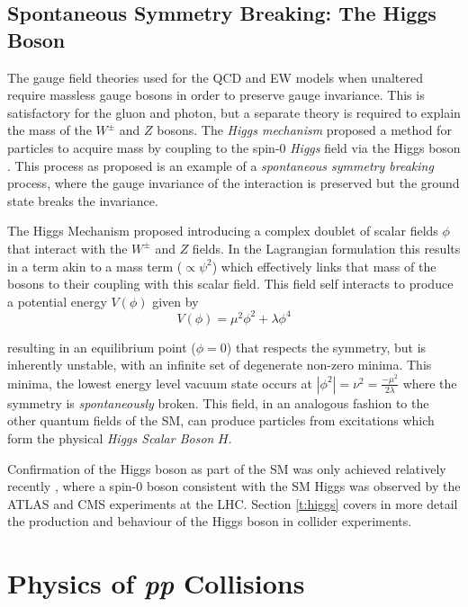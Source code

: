 	\subsection{Spontaneous Symmetry Breaking: The Higgs Boson}
	\label{t:symbreak}

	The gauge field theories used for the QCD and EW models when unaltered require massless gauge bosons in order to preserve gauge invariance. This is satisfactory for the gluon and photon, but a separate theory is required to explain the mass of the $W^\pm$ and $Z$ bosons. The \textit{Higgs mechanism} proposed a method for particles to acquire mass by coupling to the spin-$0$ \textit{Higgs} field via the Higgs boson \cite{gauge-boson-mass, higgs-1, higgs-2}. This process as proposed is an example of a \textit{spontaneous symmetry breaking} process, where the gauge invariance of the interaction is preserved but the ground state breaks the invariance.

	The Higgs Mechanism proposed introducing a complex doublet of scalar fields $\phi$ that interact with the $W^\pm$ and $Z$ fields. In the Lagrangian formulation this results in a term akin to a mass term ($\propto\psi^2$) which effectively links that mass of the bosons to their coupling with this scalar field. This field self interacts to produce a potential energy $V(\phi)$ given by
	 \begin{equation}
		 V(\phi) = \mu^2\phi^2 + \lambda\phi^4
	 \end{equation}

	 	resulting in an equilibrium point ($\phi=0$) that respects the symmetry, but is inherently unstable, with an infinite set of degenerate non-zero minima. This minima, the lowest energy level vacuum state occurs at $|\phi^2|=\nu^2=\frac{-\mu^2}{2\lambda}$ where the symmetry is \textit{spontaneously} broken. This field, in an analogous fashion to the other quantum fields of the SM, can produce particles from excitations which form the physical \textit{Higgs Scalar Boson} $H$.

	 Confirmation of the Higgs boson as part of the SM was only achieved relatively recently \cite{higgs-atlas, higgs-cms}, where a spin-$0$ boson consistent with the SM Higgs was observed by the ATLAS and CMS experiments at the LHC. Section \ref{t:higgs} covers in more detail the production and behaviour of the Higgs boson in collider experiments.


\section{Physics of \textit{pp} Collisions}

